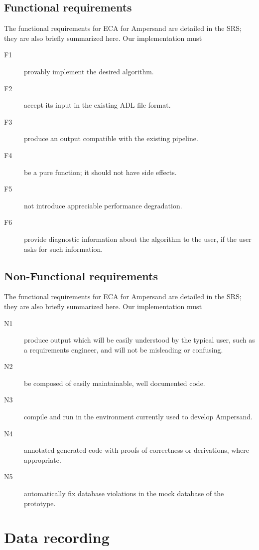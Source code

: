 \documentclass[12pt]{report}
\begin{document}
\subsection{Functional requirements}\label{subsec:FunReqs}
The functional requirements for ECA for Ampersand are detailed in the SRS; they
are also briefly summarized here. Our implementation must

\begin{description}
\item[F1] provably implement the desired algorithm.
\item[F2] accept its input in the existing ADL file format.
\item[F3] produce an output compatible with the existing pipeline. 
\item[F4] be a pure function; it should not have side effects.  
\item[F5] not introduce appreciable performance degradation. 
\item[F6] provide diagnostic information about the algorithm to
the user, if the user asks for such information.
\end{description}

\subsection{Non-Functional requirements}\label{subsec:NonFunReqs}
The functional requirements for ECA for Ampersand are detailed in the SRS; they
are also briefly summarized here. Our implementation must

\begin{description}
\item[N1] produce output which will be easily understood by the typical user,
  such as a requirements engineer, and will not be misleading or confusing.  
\item[N2] be composed of easily maintainable, well documented code.
\item[N3] compile and run in the environment currently used to develop
  Ampersand.
\item[N4] annotated generated code with proofs of correctness or derivations,
  where appropriate. 
\item[N5] automatically fix database violations in the mock database of the
  prototype. 
\end{description}

\section{Data recording}\label{sec:DataRec}
\end{document}
